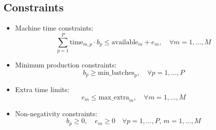 \documentclass{article}
\begin{document}
\subsection*{Constraints}
\begin{itemize}
    \item Machine time constraints:
    \[
    \sum_{p=1}^{P} \text{time}_{m,p} \cdot b_p \leq \text{available}_{m} + e_m, \quad \forall m = 1, \ldots, M
    \]
    \item Minimum production constraints:
    \[
    b_p \geq \text{min\_batches}_{p}, \quad \forall p = 1, \ldots, P
    \]
    \item Extra time limits:
    \[
    e_m \leq \text{max\_extra}_{m}, \quad \forall m = 1, \ldots, M
    \]
    \item Non-negativity constraints:
    \[
    b_p \geq 0, \quad e_m \geq 0 \quad \forall p = 1, \ldots, P, \, m = 1, \ldots, M
    \]
\end{itemize}
\end{document}
